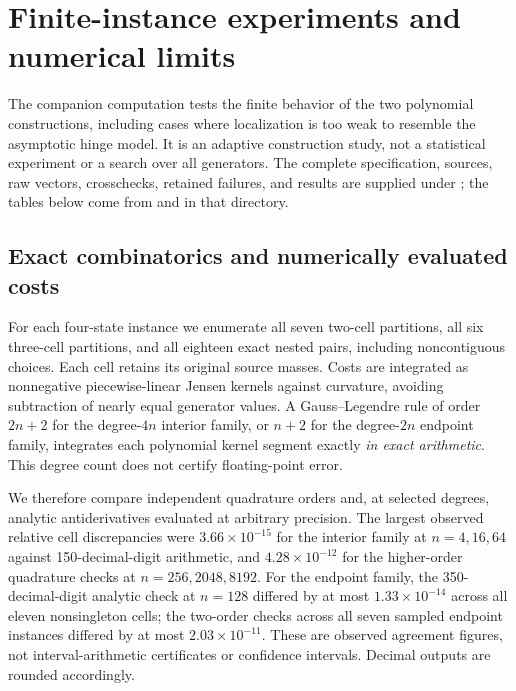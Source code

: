 \section{Finite-instance experiments and numerical limits}
\label{sec:experiments}
The companion computation tests the finite behavior of the two polynomial
constructions, including cases where localization is too weak to resemble
the asymptotic hinge model. It is an adaptive construction study, not a
statistical experiment or a search over all generators. The complete
specification, sources, raw vectors, crosschecks, retained failures, and
results are supplied under ; the tables below
come from  and
 in that directory.

\subsection{Exact combinatorics and numerically evaluated costs}
For each four-state instance we enumerate all seven two-cell partitions,
all six three-cell partitions, and all eighteen exact nested pairs, including
noncontiguous choices. Each cell retains its original source masses.
Costs are integrated as nonnegative piecewise-linear Jensen kernels against
curvature, avoiding subtraction of nearly equal generator values. A
Gauss--Legendre rule of order $2n+2$ for the degree-$4n$ interior family,
or $n+2$ for the degree-$2n$ endpoint family, integrates each polynomial
kernel segment exactly \emph{in exact arithmetic}. This degree count does
not certify floating-point error.

We therefore compare independent quadrature orders and, at selected degrees,
analytic antiderivatives evaluated at arbitrary precision. The largest
observed relative cell discrepancies were $3.66\times10^{-15}$ for the
interior family at $n=4,16,64$ against 150-decimal-digit arithmetic, and
$4.28\times10^{-12}$ for the higher-order quadrature checks at
$n=256,2048,8192$. For the endpoint family, the 350-decimal-digit analytic
check at $n=128$ differed by at most $1.33\times10^{-14}$ across all eleven
nonsingleton cells; the two-order checks across all seven sampled endpoint
instances differed by at most $2.03\times10^{-11}$. These are observed
agreement figures, not interval-arithmetic certificates or confidence
intervals. Decimal outputs are rounded accordingly.

